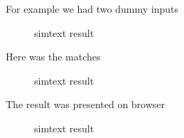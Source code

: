 For example we had two dummy inputs

\begin{figure}[!h]
  \centering
  \caption{simtext result}
  \label{fig:simtext _result}
\end{figure}

Here was the matches

\begin{figure}[!h]
  \centering
  \caption{simtext result}
  \label{fig:simtext_result}
\end{figure}
The result was presented on browser

\begin{figure}[!h]
  \centering
  \caption{simtext result}
  \label{fig:report_deckblatt}
\end{figure}